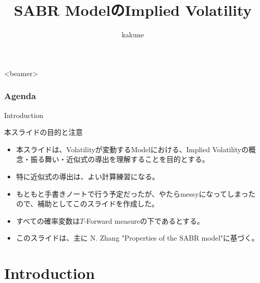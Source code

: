 \documentclass[dvipdfmx,9pt]{beamer}
\title{SABR ModelのImplied Volatility}
\author{kakune}
\begin{document}
\begin{frame}
  \titlepage
\end{frame}

\begin{frame}<beamer>
  \frametitle{Agenda}
  \tableofcontents
\end{frame}

\begin{frame}{Introduction}
  \begin{alertblock}{本スライドの目的と注意}
    \begin{itemize}
      \item 本スライドは、Volatilityが変動するModelにおける、Implied Volatilityの概念・振る舞い・近似式の導出を理解することを目的とする。
      \item 特に近似式の導出は、よい計算練習になる。
      \item もともと手書きノートで行う予定だったが、やたらmessyになってしまったので、補助としてこのスライドを作成した。
      \item すべての確率変数は$T$-Forward measureの下であるとする。
      \item このスライドは、主に N. Zhang "Properties of the SABR model"に基づく。
    \end{itemize}
  \end{alertblock}
\end{frame}

\section{Introduction}
\end{document}
